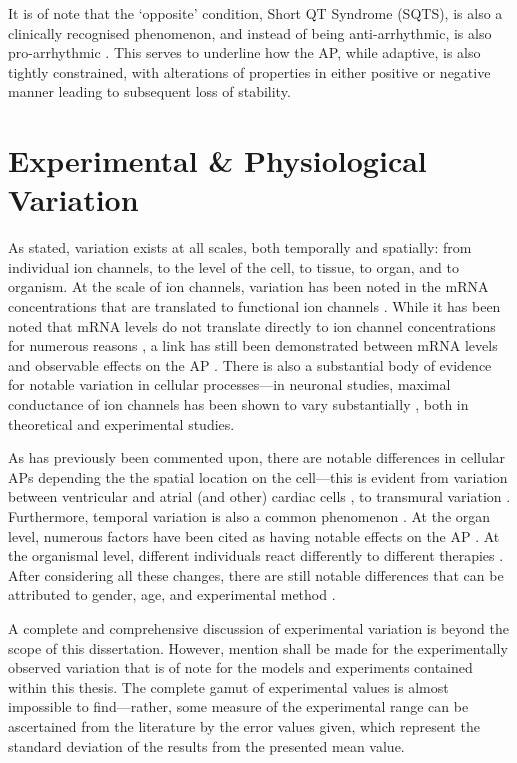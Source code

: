 \documentclass[../thesis-main.tex]{subfiles}
\begin{document}
It is of note that the `opposite' condition, Short QT Syndrome (SQTS), is also a clinically recognised phenomenon, and instead of being anti-arrhythmic, is also pro-arrhythmic \citep{Adeniran2011}. This serves to underline how the AP, while adaptive, is also tightly constrained, with alterations of properties in either positive or negative manner leading to subsequent loss of stability.

\section{Experimental \& Physiological Variation}
\label{subsec:experimental-var}
As stated, variation exists at all scales, both temporally and spatially: from individual ion channels, to the level of the cell, to tissue, to organ, and to organism. At the scale of ion channels, variation has been noted in the mRNA concentrations that are translated to functional ion channels \citep{Gaborit2007}. While it has been noted that mRNA levels do not translate directly to ion channel concentrations for numerous reasons \citep{Edelman2001, Nattel2010}, a link has still been demonstrated between mRNA levels and observable effects on the AP \citep{Walmsley2013}. There is also a substantial body of evidence for notable variation in cellular processes---in neuronal studies, maximal conductance of ion channels has been shown to vary substantially \citep{Marder2011, Goaillard2009, Schulz2006}, both in theoretical and experimental studies.

As has previously been commented upon, there are notable differences in cellular APs depending the the spatial location on the cell---this is evident from variation between ventricular and atrial (and other) cardiac cells \citep{Carmeliet2002}, to transmural variation \citep{Antzelevitch1991}. Furthermore, temporal variation is also a common phenomenon \citep{Walmsley2010}. At the organ level, numerous factors have been cited as having notable effects on the AP \citep{Taylor1997}. At the organismal level, different individuals react differently to different therapies \citep{Kannankeril2010}. After considering all these changes, there are still notable differences that can be attributed to gender, age, and experimental method \citep{Yang2012, Kurokawa2012}.

A complete and comprehensive discussion of experimental variation is beyond the scope of this dissertation. However, mention shall be made for the experimentally observed variation that is of note for the models and experiments contained within this thesis. The complete gamut of experimental values is almost impossible to find---rather, some measure of the experimental range can be ascertained from the literature by the error values given, which represent the standard deviation of the results from the presented mean value.
\end{document}

